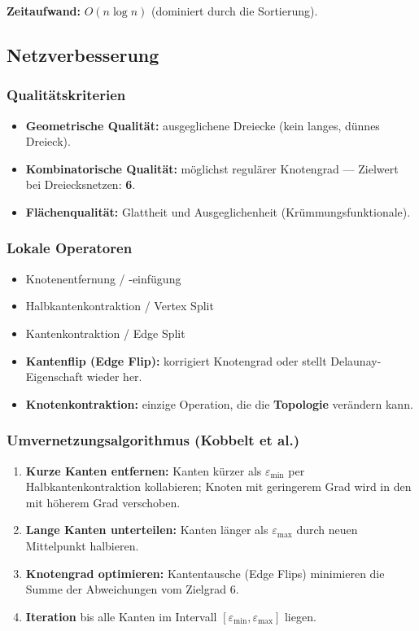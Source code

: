 \documentclass[12pt, a4paper]{article}
\begin{document}
\textbf{Zeitaufwand:} $O(n \log n)$ (dominiert durch die Sortierung).

\subsection{Netzverbesserung}

\subsubsection*{Qualitätskriterien}
\begin{itemize}
  \item \textbf{Geometrische Qualität:} ausgeglichene Dreiecke (kein langes, dünnes Dreieck).
  \item \textbf{Kombinatorische Qualität:} möglichst regulärer Knotengrad — Zielwert bei Dreiecksnetzen: \textbf{6}.
  \item \textbf{Flächenqualität:} Glattheit und Ausgeglichenheit (Krümmungsfunktionale).
\end{itemize}

\subsubsection*{Lokale Operatoren}
\begin{itemize}
  \item Knotenentfernung / -einfügung
  \item Halbkantenkontraktion / Vertex Split
  \item Kantenkontraktion / Edge Split
  \item \textbf{Kantenflip (Edge Flip):} korrigiert Knotengrad oder stellt Delaunay-Eigenschaft wieder her.
  \item \textbf{Knotenkontraktion:} einzige Operation, die die \textbf{Topologie} verändern kann.
\end{itemize}

\subsubsection*{Umvernetzungsalgorithmus (Kobbelt et al.)}
\begin{enumerate}
  \item \textbf{Kurze Kanten entfernen:} Kanten kürzer als $\varepsilon_{\min}$ per Halbkantenkontraktion kollabieren; Knoten mit geringerem Grad wird in den mit höherem Grad verschoben.
  \item \textbf{Lange Kanten unterteilen:} Kanten länger als $\varepsilon_{\max}$ durch neuen Mittelpunkt halbieren.
  \item \textbf{Knotengrad optimieren:} Kantentausche (Edge Flips) minimieren die Summe der Abweichungen vom Zielgrad 6.
  \item \textbf{Iteration} bis alle Kanten im Intervall $[\varepsilon_{\min}, \varepsilon_{\max}]$ liegen.
\end{enumerate}
\end{document}
